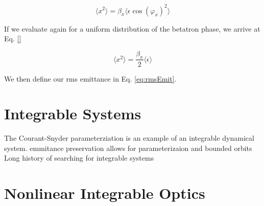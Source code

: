 \begin{equation} \label{eq:momX2}
	\langle x^2 \rangle = \beta_x \langle \epsilon \cos{(\varphi_x)}^2 \rangle
\end{equation}

If we evaluate again for a uniform distribution of the betatron phase, we arrive at Eq. \ref{}

\begin{equation} \label{eq:emitDef}
	\langle x^2 \rangle = \frac{\beta_x}{2} \langle \epsilon \rangle
\end{equation}

We then define our rms emittance in Eq. \ref{eq:rmsEmit}. 


\section{Integrable Systems} \label{sec:integral}
The Courant-Snyder parameterziation is an example of an integrable dynamical system.
emmitance preservation allows for parameterizaion and bounded orbits
Long history of searching for integrable systems

\section{Nonlinear Integrable Optics} \label{sec:nio}


\cite{danilov_nonlinear_2010}
